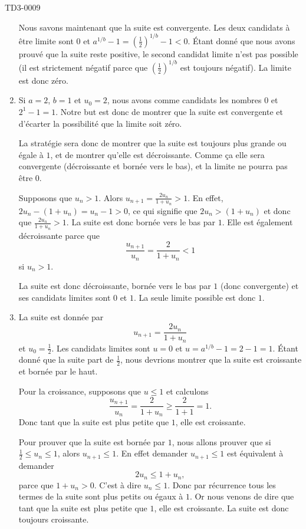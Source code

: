 \begin{corrige}{TD3-0009}
\begin{enumerate}
            Nous savons maintenant que la suite est convergente. Les deux candidats à être limite sont $0$ et $a^{1/b}-1=(\frac{ 1 }{2})^{1/b}-1<0$. Étant donné que nous avons prouvé que la suite reste positive, le second candidat limite n'est pas possible (il est strictement négatif parce que $(\frac{1}{ 2 })^{1/b}$ est toujours négatif). La limite est donc zéro.

		\item
			Si $a=2$, $b=1$ et $u_0=2$, nous avons comme candidats les nombres $0$ et $2^{1}-1=1$. Notre but est donc de montrer que la suite est convergente et d'écarter la possibilité que la limite soit zéro.

			La stratégie sera donc de montrer que la suite est toujours plus grande ou égale à $1$, et de montrer qu'elle est décroissante. Comme ça elle sera convergente (décroissante et bornée vers le bas), et la limite ne pourra pas être $0$.

			Supposons que $u_n>1$. Alors $u_{n+1}=\frac{ 2u_n }{ 1+u_n }>1$. En effet, $2u_n-(1+u_n)=u_n-1>0$, ce qui signifie que $2u_n>(1+u_n)$ et donc que $\frac{ 2u_n }{ 1+u_n }>1$. La suite est donc bornée vers le bas par $1$. Elle est également décroissante parce que
			\begin{equation}
				\frac{ u_{n+1} }{ u_n }=\frac{ 2 }{ 1+u_n }<1
			\end{equation}
			si $u_n>1$.

			La suite est donc décroissante, bornée vers le bas par $1$ (donc convergente) et ses candidats limites sont $0$ et $1$. La seule limite possible est donc $1$.

		\item
			La suite est donnée par
			\begin{equation}
				u_{n+1}=\frac{ 2u_n }{ 1+u_n }
			\end{equation}
			et $u_0=\frac{ 1 }{2}$. Les candidats limites sont $u=0$ et $u=a^{1/b}-1=2-1=1$. Étant donné que la suite part de $\frac{ 1 }{2}$, nous devrions montrer que la suite est croissante et bornée par le haut. 

			Pour la croissance, supposons que $u\leq 1$ et calculons
			\begin{equation}
				\frac{ u_{n+1} }{ u_n }=\frac{ 2 }{ 1+u_n }\geq \frac{ 2 }{ 1+1 }=1.
			\end{equation}
			Donc tant que la suite est plus petite que $1$, elle est croissante.

            Pour prouver que la suite est bornée par $1$, nous allons prouver que si $\frac{ 1 }{2}\leq u_n\leq 1$, alors $u_{n+1}\leq 1$. En effet demander \( u_{n+1}\leq 1\) est équivalent à demander
            \begin{equation}
                2u_n\leq 1+u_n,
            \end{equation}
            parce que \( 1+u_n>0\). C'est à dire \( u_n\leq 1\). Donc par récurrence tous les termes de la suite sont plus petits ou égaux à \( 1\). Or nous venons de dire que tant que la suite est plus petite que \( 1\), elle est croissante. La suite est donc toujours croissante.
    

\end{enumerate}
\end{corrige}
